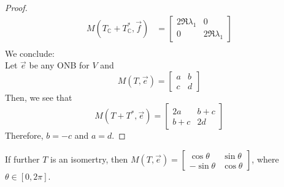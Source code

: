 \documentclass{aq-notes}
\begin{document}
\begin{theorem}
\begin{proof}
\begin{align*}
                M(T_\mathbb{C} + T^*_\mathbb{C},\vec f) &= \begin{bmatrix}
                    2\Re\lambda_1 & 0\\
                    0 & 2\Re{\lambda_1}
                \end{bmatrix}\\
            \end{align*}
            We conclude:\\
            Let $\vec e$ be any ONB for $V$ and
            \[\displaystyle M(T, \vec e) = 
            \begin{bmatrix}
                a & b \\
                c & d
            \end{bmatrix}\]
            Then, we see that
            \[\displaystyle M(T+ T^*, \vec e) = 
            \begin{bmatrix}
                2a & b+c \\
                b+c & 2d
            \end{bmatrix}\]
            Therefore, $b = -c$ and $a =d$.
        \end{proof}
    \end{theorem}
\begin{corollary}
        If further $T$ is an isomertry, then $\displaystyle M(T, \vec e) = 
        \begin{bmatrix}
            \cos\theta & \sin\theta \\
            -\sin\theta & \cos\theta
        \end{bmatrix}$, where $\theta \in [0,2\pi]$.
\end{corollary}
\end{document}
